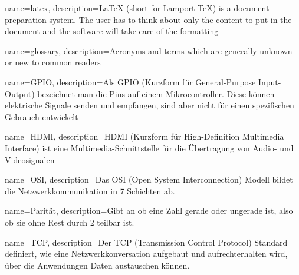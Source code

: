 











{
	name=latex,
	description={LaTeX (short for Lamport TeX) is a document preparation system. The user has to think about only the content to put in the document and the software will take care of the formatting}
}

{
	name=glossary,
	description={Acronyms and terms which are generally unknown or new to common readers}
}

{
	name=GPIO,
	description={Als GPIO (Kurzform für General-Purpose Input-Output) bezeichnet man die Pins auf einem Mikrocontroller. Diese können elektrische Signale senden und empfangen, sind aber nicht für einen spezifischen Gebrauch entwickelt}
}

{
	name=HDMI,
	description={HDMI (Kurzform für High-Definition Multimedia Interface) ist eine Multimedia-Schnittstelle für die Übertragung von Audio- und Videosignalen}
}

{
	name=OSI,
	description={Das OSI (Open System Interconnection) Modell bildet die Netzwerkkommunikation in 7 Schichten ab. \cite[vgl.][]{Schnabel_osi:o.J.}}
}

{
	name=Parität,
	description={Gibt an ob eine Zahl gerade oder ungerade ist, also ob sie ohne Rest durch 2 teilbar ist. \cite[vgl.][]{Parity_Mathematik:o.J.}}
}

{
	name=TCP,
	description={Der TCP (Transmission Control Protocol) Standard definiert, wie eine Netzwerkkonversation aufgebaut und aufrechterhalten wird, über die Anwendungen Daten austauschen können. \cite[vgl.][]{Lutkevich:2021}}
}

